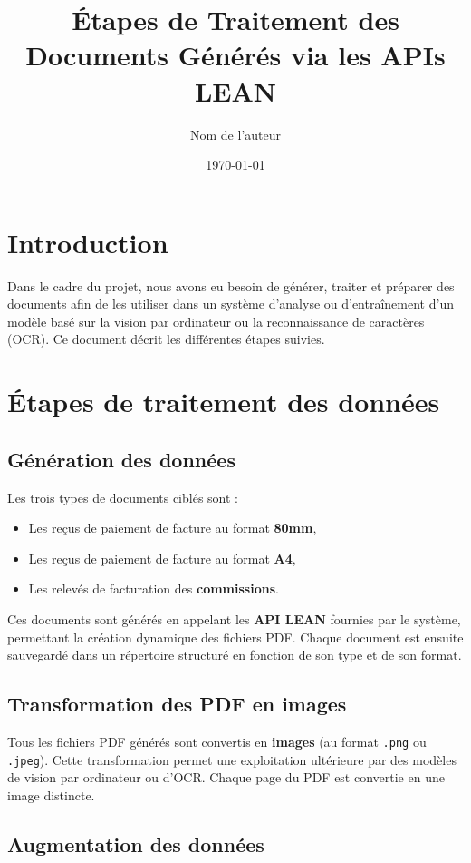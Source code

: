 \documentclass[11pt,a4paper]{article}
\title{Étapes de Traitement des Documents Générés via les APIs LEAN}
\author{Nom de l'auteur}
\date{\today}
\begin{document}
\maketitle

\section{Introduction}
Dans le cadre du projet, nous avons eu besoin de générer, traiter et préparer des documents afin de les utiliser dans un système d'analyse ou d'entraînement d'un modèle basé sur la vision par ordinateur ou la reconnaissance de caractères (OCR). Ce document décrit les différentes étapes suivies.

\section{Étapes de traitement des données}

\subsection{Génération des données}

Les trois types de documents ciblés sont :
\begin{itemize}
    \item Les reçus de paiement de facture au format \textbf{80mm},
    \item Les reçus de paiement de facture au format \textbf{A4},
    \item Les relevés de facturation des \textbf{commissions}.
\end{itemize}

Ces documents sont générés en appelant les \textbf{API LEAN} fournies par le système, permettant la création dynamique des fichiers PDF. Chaque document est ensuite sauvegardé dans un répertoire structuré en fonction de son type et de son format.

\subsection{Transformation des PDF en images}

Tous les fichiers PDF générés sont convertis en \textbf{images} (au format \texttt{.png} ou \texttt{.jpeg}). Cette transformation permet une exploitation ultérieure par des modèles de vision par ordinateur ou d'OCR. Chaque page du PDF est convertie en une image distincte.

\subsection{Augmentation des données}
\end{document}
